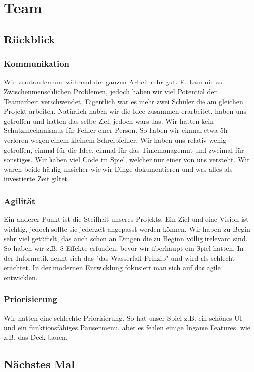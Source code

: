 \chapter{Team}

\section{Rückblick}

\subsection*{Kommunikation}
Wir verstanden uns während der ganzen Arbeit sehr gut.
Es kam nie zu Zwischenmenschlichen Problemen, jedoch haben wir viel Potential der Teamarbeit verschwendet.
Eigentlich war es mehr zwei Schüler die am gleichen Projekt arbeiten.
Natürlich haben wir die Idee zusammen erarbeitet, haben uns getroffen und hatten das selbe Ziel, jedoch wars das.
Wir hatten kein Schutzmechanismus für Fehler einer Person.
So haben wir einmal etwa 5h verloren wegen einem kleinem Schreibfehler.
Wir haben uns relativ wenig getroffen, einmal für die Idee, einmal für das Timemanagemnt und zweimal für sonstiges.
Wir haben viel Code im Spiel, welcher nur einer von uns versteht.
Wir waren beide häufig unsicher wie wir Dinge dokumentieren und was alles als investierte Zeit giltet.

\subsection*{Agilität}
Ein anderer Punkt ist die Steifheit unseres Projekts.
Ein Ziel und eine Vision ist wichtig, jedoch sollte sie jederzeit angepasst werden können.
Wir haben zu Begin sehr viel getüftelt, das auch schon an Dingen die zu Beginn völlig irelevant sind.
So haben wir z.B. 8 Effekte erfunden, bevor wir überhaupt ein Spiel hatten.
In der Informatik nennt sich das "das Wasserfall-Prinzip" und wird als schlecht erachtet.
In der modernen Entwicklung fokusiert man sich auf das agile entwicklen.

\subsection*{Priorisierung}
Wir hatten eine schlechte Priorisierung.
So hat unser Spiel z.B. ein schönes UI und ein funktionsfähiges Pausenmenu, aber es fehlen einige Ingame Features, wie z.B. das Deck bauen.


\section{Nächstes Mal}

